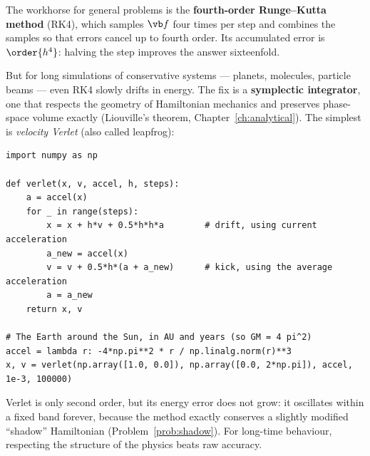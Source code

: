 The workhorse for general problems is the \textbf{fourth-order Runge--Kutta method} (RK4), which samples $\vb f$ four times per step and combines the samples so that errors cancel up to fourth order. Its accumulated error is $\order{h^4}$: halving the step improves the answer sixteenfold.

But for long simulations of conservative systems --- planets, molecules, particle beams --- even RK4 slowly drifts in energy. The fix is a \textbf{symplectic integrator}, one that respects the geometry of Hamiltonian mechanics and preserves phase-space volume exactly (Liouville's theorem, Chapter~\ref{ch:analytical}). The simplest is \emph{velocity Verlet} (also called leapfrog):

\begin{lstlisting}
import numpy as np

def verlet(x, v, accel, h, steps):
    a = accel(x)
    for _ in range(steps):
        x = x + h*v + 0.5*h*h*a        # drift, using current acceleration
        a_new = accel(x)
        v = v + 0.5*h*(a + a_new)      # kick, using the average acceleration
        a = a_new
    return x, v

# The Earth around the Sun, in AU and years (so GM = 4 pi^2)
accel = lambda r: -4*np.pi**2 * r / np.linalg.norm(r)**3
x, v = verlet(np.array([1.0, 0.0]), np.array([0.0, 2*np.pi]), accel, 1e-3, 100000)
\end{lstlisting}

Verlet is only second order, but its energy error does not grow: it oscillates within a fixed band forever, because the method exactly conserves a slightly modified ``shadow'' Hamiltonian (Problem~\ref{prob:shadow}). For long-time behaviour, respecting the structure of the physics beats raw accuracy.


